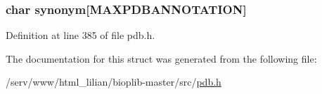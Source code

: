 \hypertarget{struct__compnd_a0e6ae9ba6df02f199726b0e5fe84dc39}{
\subsubsection[{synonym}]{\setlength{\rightskip}{0pt plus 5cm}char synonym\mbox{[}{\bf M\-A\-X\-P\-D\-B\-A\-N\-N\-O\-T\-A\-T\-I\-O\-N}\mbox{]}}}\label{struct__compnd_a0e6ae9ba6df02f199726b0e5fe84dc39}


Definition at line 385 of file pdb.\-h.



The documentation for this struct was generated from the following file\-:\begin{DoxyCompactItemize}
\item 
/serv/www/html\-\_\-lilian/bioplib-\/master/src/\hyperlink{pdb_8h}{pdb.\-h}\end{DoxyCompactItemize}
